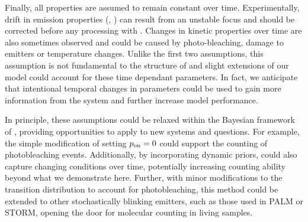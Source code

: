 Finally, all properties are assumed to remain constant over time. 
  Experimentally, drift in emission properties (\re, \rb) can result from 
  an unstable focus and should be corrected before any processing with
  \ours.
  Changes in kinetic properties over time are also sometimes observed and could
  be caused by photo-bleaching, damage to emitters or temperature changes. 
  Unlike the first two assumptions, this assumption is not fundamental to the
  structure of \ours and slight extensions of our model could account for these
  time dependant parameters.
  In fact, we anticipate that intentional temporal changes in parameters could be used to gain more
  information from the system and further increase model performance.

In principle, these assumptions could be relaxed within the Bayesian framework of \ours,
providing opportunities to apply \ours to new systems and questions.
    For example, the simple modification of setting $p_\text{on}=0$ could support the
    counting of photobleaching events.
    Additionally, by incorporating dynamic priors, \ours could also capture
    changing conditions over time, potentially increasing counting
    ability beyond what we demonstrate here.
    Further, with minor modifications to the transition distribution to account
    for photobleaching, this method could be extended to other stochastically
    blinking emitters, such as those used in PALM or STORM, opening the door
    for molecular counting in living samples.
